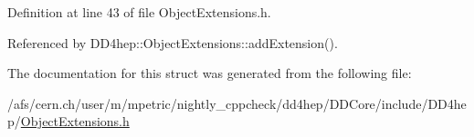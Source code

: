 Definition at line 43 of file Object\+Extensions.\+h.



Referenced by D\+D4hep\+::\+Object\+Extensions\+::add\+Extension().



The documentation for this struct was generated from the following file\+:\begin{DoxyCompactItemize}
\item 
/afs/cern.\+ch/user/m/mpetric/nightly\+\_\+cppcheck/dd4hep/\+D\+D\+Core/include/\+D\+D4hep/\hyperlink{_object_extensions_8h}{Object\+Extensions.\+h}\end{DoxyCompactItemize}
